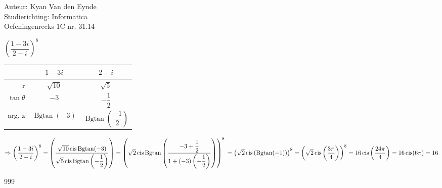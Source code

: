 \documentclass[a4paper]{article}
\newcommand{\Bgtan}{\operatorname{Bgtan}}
\newcommand{\cis}{\operatorname{cis}}
\begin{document}
  
\noindent \large Auteur: Kyan Van den Eynde\\
\noindent \large Studierichting: Informatica\\
\noindent \large Oefeningenreeks 1C nr. 31.14\\

\medskip

\normalsize

$\left(\dfrac{1-3i}{2-i}\right)^8$\\

\begin{tabular}{r|cc}
	          & $1-3i$           & $2-i$ \\ \hline
r	          & $\sqrt{10}$      & $\sqrt{5}$ \\
$\tan \theta$ & $-3$             & $-\dfrac{1}{2}$ \\
arg. z	      & $\Bgtan (-3)$    & $\Bgtan \left(\dfrac{-1}{2}\right)$ \\
\end{tabular}

$\Rightarrow \left(\dfrac{1-3i}{2-i}\right)^8 = \left(\dfrac{\sqrt{10} \cis \Bgtan(-3)}{\sqrt{5} \cis \Bgtan\left(-\dfrac{1}{2}\right)}\right) = \left(\sqrt{2} \cis \Bgtan \left(\dfrac{-3 + \dfrac{1}{2}}{1+(-3)\left(-\dfrac{1}{2}\right)}\right)\right)^8\\
= \left(\sqrt{2} \cis \left(\Bgtan(-1)\right)\right)^8 = \left(\sqrt{2} \cis \left(\dfrac{3\pi}{4}\right)\right)^8 = 16 \cis \left(\dfrac{24\pi}{4} \right) = 16 \cis (6\pi) = 16$ \\


\begin{thebibliography}{999}
\end{thebibliography}
\end{document}

